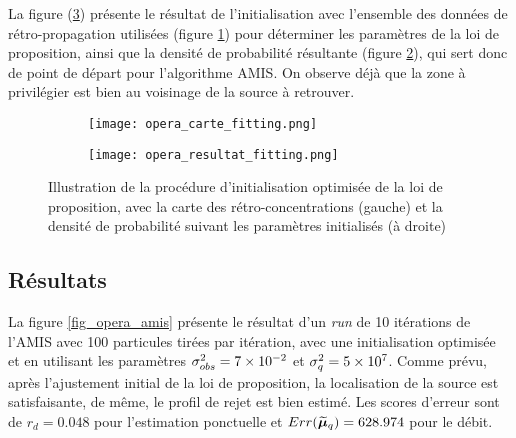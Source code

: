 La figure (\ref{fig_opera_fitting}) présente le résultat de l'initialisation avec l'ensemble des données de rétro-propagation utilisées (figure \ref{opera_carte_fitting}) pour déterminer les paramètres de la loi de proposition, ainsi que la densité de probabilité résultante  (figure \ref{opera_resultat_fitting}), qui sert donc de point de départ pour l'algorithme AMIS. On observe déjà que la zone à privilégier est bien au voisinage de la source à retrouver.\\

\begin{figure}[h!]
	\centering
	\begin{subfigure}[t]{0.5\textwidth}
		\centering
		\texttt{[image: opera\_carte\_fitting.png]}
		\caption{}
		\label{opera_carte_fitting}
	\end{subfigure}%
	\begin{subfigure}[t]{0.5\textwidth}
		\centering
		\texttt{[image: opera\_resultat\_fitting.png]}
		\caption{}
		\label{opera_resultat_fitting}
	\end{subfigure}
	\caption{Illustration de la procédure d'initialisation optimisée de la loi de proposition, avec la carte des rétro-concentrations (gauche) et la densité de probabilité suivant les paramètres initialisés (à droite)}
	\label{fig_opera_fitting}
	
\end{figure}

\subsection{Résultats}

La figure \ref{fig_opera_amis} présente le résultat d'un \textit{run} de 10 itérations de l'AMIS avec 100 particules tirées par itération, avec une initialisation optimisée et en utilisant les paramètres ${\sigma_{obs}^2} = 7 \times 10^{-2}$ et $\sigma_q^2 = 5\times 10^7$. Comme {prévu}, après l'ajustement initial de la loi de proposition, la localisation de la source est {satisfaisante}, de même, le profil de rejet est bien estimé. Les scores d'erreur sont de $r_d = 0.048$ pour l'estimation ponctuelle et $Err(\widetilde{{\bm{\mu}}}_q) = 628.974$ pour le débit.


